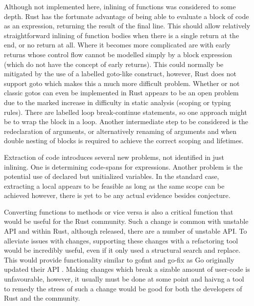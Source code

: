 Although not implemented here, inlining of functions was considered to some depth. Rust has the fortunate advantage of being able to evaluate a block of code as an expression, returning the result of the final line. This should allow relatively straightforward inlining of function bodies when there is a single return at the end, or no return at all. Where it becomes more complicated are with early returns whose control flow cannot be modelled simply by a block expression (which do not have the concept of early returns). This could normally be mitigated by the use of a labelled goto-like construct, however, Rust does not support goto which makes this a much more difficult problem. Whether or not classic gotos can even be implemented in Rust appears to be an open problem due to the marked increase in difficulty in static analysis (scoping or typing rules). There are labelled loop break-continue statements, so one approach might be to wrap the block in a loop. Another intermediate step to be considered is the redeclaration of arguments, or alternatively renaming of arguments and when double nesting of blocks is required to achieve the correct scoping and lifetimes.

Extraction of code introduces several new problems, not identified in just inlining. One is determining code-spans for expressions. Another problem is the potential use of declared but unitialized variables. In the standard case, extracting a local appears to be feasible as long as the same scope can be achieved however, there is yet to be any actual evidence besides conjecture.


Converting functions to methods or vice versa is also a critical function that would be useful for the Rust community. Such a change is common with unstable API and within Rust, although released, there are a number of unstable API. To alleviate issues with changes, supporting these changes with a refactoring tool would be incredibly useful, even if it only used a structural search and replace. This would provide functionality similar to gofmt and go-fix as Go originally updated their API \cite{gofix11}. Making changes which break a sizable amount of user-code is unfavourable, however, it usually must be done at some point and haivng a tool to remedy the stress of such a change would be good for both the developers of Rust and the community.

